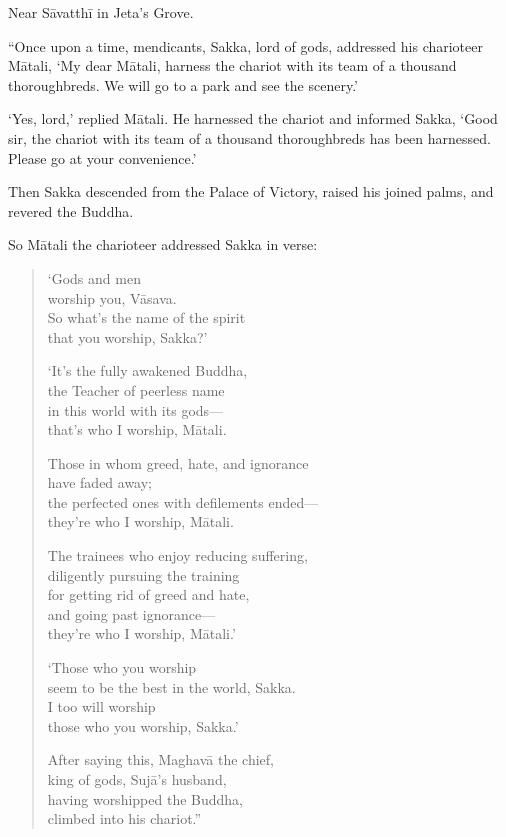 \documentclass[12pt,openany]{book}%
\begin{document}
Near \textsanskrit{Sāvatthī} in Jeta’s Grove. 

“Once upon a time, mendicants, Sakka, lord of gods, addressed his charioteer \textsanskrit{Mātali}, ‘My dear \textsanskrit{Mātali}, harness the chariot with its team of a thousand thoroughbreds. We will go to a park and see the scenery.’ 

‘Yes, lord,’ replied \textsanskrit{Mātali}. He harnessed the chariot and informed Sakka, ‘Good sir, the chariot with its team of a thousand thoroughbreds has been harnessed. Please go at your convenience.’ 

Then Sakka descended from the Palace of Victory, raised his joined palms, and revered the Buddha. 

So \textsanskrit{Mātali} the charioteer addressed Sakka in verse: 

\begin{verse}%
‘Gods and men \\
worship you, \textsanskrit{Vāsava}. \\
So what’s the name of the spirit \\
that you worship, Sakka?’ 

‘It’s the fully awakened Buddha, \\
the Teacher of peerless name \\
in this world with its gods—\\
that’s who I worship, \textsanskrit{Mātali}. 

Those in whom greed, hate, and ignorance \\
have faded away; \\
the perfected ones with defilements ended—\\
they're who I worship, \textsanskrit{Mātali}. 

The trainees who enjoy reducing suffering, \\
diligently pursuing the training \\
for getting rid of greed and hate, \\
and going past ignorance—\\
they’re who I worship, \textsanskrit{Mātali}.’ 

‘Those who you worship \\
seem to be the best in the world, Sakka. \\
I too will worship \\
those who you worship, Sakka.’ 

After saying this, \textsanskrit{Maghavā} the chief, \\
king of gods, \textsanskrit{Sujā}’s husband, \\
having worshipped the Buddha, \\
climbed into his chariot.” 

%
\end{verse}
\end{document}
